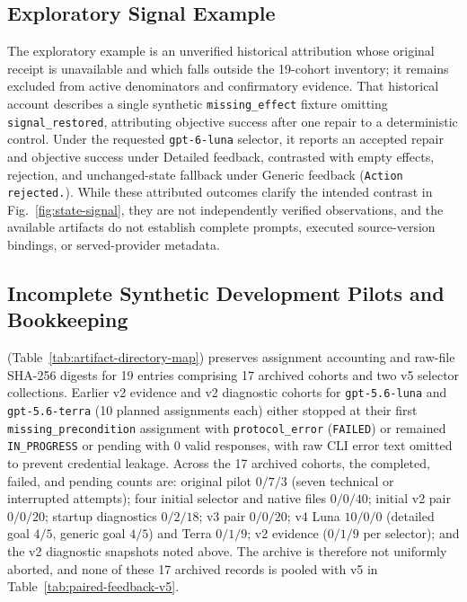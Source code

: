 \documentclass[journal]{IEEEtran}
\begin{document}
\subsection{Exploratory Signal Example}
The exploratory example is an unverified historical attribution whose original receipt is unavailable and which falls outside the 19-cohort inventory; it remains excluded from active denominators and confirmatory evidence.
That historical account describes a single synthetic \texttt{missing\_effect} fixture omitting \texttt{signal\_restored}, attributing objective success after one repair to a deterministic control. Under the requested \texttt{gpt-6-luna} selector, it reports an accepted repair and objective success under Detailed feedback, contrasted with empty effects, rejection, and unchanged-state fallback under Generic feedback (\texttt{Action rejected.}). While these attributed outcomes clarify the intended contrast in Fig.~\ref{fig:state-signal}, they are not independently verified observations, and the available artifacts do not establish complete prompts, executed source-version bindings, or served-provider metadata.

\subsection{Incomplete Synthetic Development Pilots and Bookkeeping}
 (Table~\ref{tab:artifact-directory-map}) preserves assignment accounting and raw-file SHA-256 digests for 19 entries comprising 17 archived cohorts and two v5 selector collections. Earlier v2 evidence and v2 diagnostic cohorts for \texttt{gpt-5.6-luna} and \texttt{gpt-5.6-terra} (10 planned assignments each) either stopped at their first \texttt{missing\_precondition} assignment with \texttt{protocol\_error} (\texttt{FAILED}) or remained \texttt{IN\_PROGRESS} or pending with 0 valid responses, with raw CLI error text omitted to prevent credential leakage. Across the 17 archived cohorts, the completed, failed, and pending counts are: original pilot $0/7/3$ (seven technical or interrupted attempts); four initial selector and native files $0/0/40$; initial v2 pair $0/0/20$; startup diagnostics $0/2/18$; v3 pair $0/0/20$; v4 Luna $10/0/0$ (detailed goal $4/5$, generic goal $4/5$) and Terra $0/1/9$; v2 evidence ($0/1/9$ per selector); and the v2 diagnostic snapshots noted above. The archive is therefore not uniformly aborted, and none of these 17 archived records is pooled with v5 in Table~\ref{tab:paired-feedback-v5}.
\end{document}
